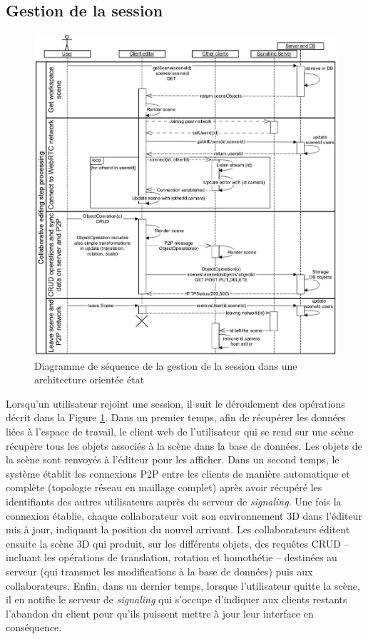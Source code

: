 \subsection{Gestion de la session}
\begin{figure}[h]
	\centering
	\includegraphics[trim={0 0 0 3cm},clip,width=0.9\columnwidth]
	{eps/sequence_wscg.eps}
	\caption{Diagramme de séquence de la gestion de la session dans une 
		architecture \og orientée état\fg{}}
	\label{fig:sequence_state}
\end{figure}
Lorsqu'un utilisateur rejoint une session, il suit le déroulement des opérations 
décrit dans la Figure \ref{fig:sequence_state}. 
Dans un premier temps, afin de récupérer les données liées à l'espace de travail, 
le client web de l'utilisateur qui se rend sur une scène récupère 
tous les objets associés à la scène dans la base de données. Les objets de la 
scène sont renvoyés à l'éditeur pour les afficher. 
Dans un second temps, le système établit les connexions \gls{P2P} entre les 
clients de manière automatique et complète (topologie réseau en maillage 
complet) après avoir récupéré les identifiants des autres utilisateurs auprès du 
serveur de \textit{signaling}. Une fois la connexion établie, chaque collaborateur 
voit son environnement \gls{3D} dans l'éditeur mis à jour, indiquant la position du 
nouvel 
arrivant. Les collaborateurs éditent ensuite la scène \gls{3D} qui produit, sur les 
différents objets, des requêtes \gls{CRUD} -- incluant les opérations de translation, 
rotation et homothétie -- destinées au serveur (qui transmet les 
modifications à la base de données) puis aux collaborateurs.
Enfin, dans un dernier temps, lorsque l'utilisateur quitte la scène, il en notifie le 
serveur de \textit{signaling} qui s'occupe d'indiquer aux clients restants l'abandon 
du client pour qu'ils puissent mettre à jour leur interface en conséquence.



